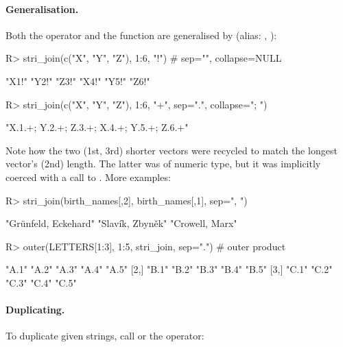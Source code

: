 \documentclass[nojss]{jss}
\begin{document}
\paragraph{Generalisation.}
Both the  operator and the  function
are generalised by
 (alias: , ):

\begin{Schunk}
\begin{Sinput}
R> stri_join(c("X", "Y", "Z"), 1:6, "!")  # sep="", collapse=NULL
\end{Sinput}
\begin{Soutput}
[1] "X1!" "Y2!" "Z3!" "X4!" "Y5!" "Z6!"
\end{Soutput}
\begin{Sinput}
R> stri_join(c("X", "Y", "Z"), 1:6, "+", sep=".", collapse="; ")
\end{Sinput}
\begin{Soutput}
[1] "X.1.+; Y.2.+; Z.3.+; X.4.+; Y.5.+; Z.6.+"
\end{Soutput}
\end{Schunk}


\noindent
Note how the two (1st, 3rd) shorter vectors were {recycled} to match
the longest vector's (2nd) length. The latter was of numeric type,
but it was implicitly coerced with  a call to .
More examples:

\begin{Schunk}
\begin{Sinput}
R> stri_join(birth_names[,2], birth_names[,1], sep=", ")
\end{Sinput}
\begin{Soutput}
[1] "Grünfeld, Eckehard" "Slavík, Zbyněk"     "Crowell, Marx"
\end{Soutput}
\begin{Sinput}
R> outer(LETTERS[1:3], 1:5, stri_join, sep=".") # outer product
\end{Sinput}
\begin{Soutput}
     [,1]  [,2]  [,3]  [,4]  [,5]
[1,] "A.1" "A.2" "A.3" "A.4" "A.5"
[2,] "B.1" "B.2" "B.3" "B.4" "B.5"
[3,] "C.1" "C.2" "C.3" "C.4" "C.5"
\end{Soutput}
\end{Schunk}


\paragraph{Duplicating.}
To duplicate given strings, call
 or the  operator:
\end{document}
